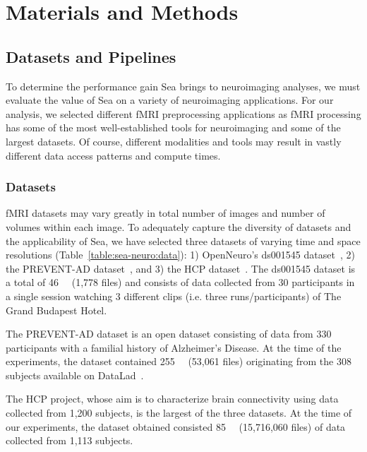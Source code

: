 \documentclass[fleqn,10pt]{wlscirep}
\begin{document}
    
    
    \section{Materials and Methods}
    
    
    \subsection{Datasets and Pipelines}
    
    To determine the performance gain Sea brings to neuroimaging analyses, we
    must evaluate the value of Sea on a variety of neuroimaging applications.
    For our analysis, we selected different fMRI preprocessing applications as
    fMRI processing has some of the most well-established tools for neuroimaging
    and some of the largest datasets. Of course, different modalities and tools
    may result in vastly different data access patterns and compute times.
    
    \subsubsection{Datasets}
    fMRI datasets may vary greatly in total number of images and number of
    volumes within each image. To adequately capture the diversity of datasets
    and the applicability of Sea, we have selected three datasets of varying
    time and space resolutions (Table~\ref{table:sea-neuro:data}): 1)
    OpenNeuro's ds001545 dataset~\cite{ds001545}, 2) the PREVENT-AD
    dataset~\cite{preventad}, and 3) the HCP dataset~\cite{HCP}. The ds001545
    dataset is a total of \SI{46}{\giga\byte} (1,778 files) and consists of data
    collected from 30 participants in a single session watching 3 different
    clips (i.e. three runs/participants) of The Grand Budapest Hotel.
    
    
    The PREVENT-AD dataset is an open dataset consisting of data from 330
    participants with a familial history of Alzheimer's Disease. At the time of
    the experiments, the dataset contained \SI{255}{\giga\byte} (53,061 files)
    originating from the 308 subjects available on
    DataLad~\cite{halchenko2021datalad}.
    
    The HCP project, whose aim is to characterize brain connectivity using data
    collected from 1,200 subjects, is the largest of the three datasets. At the
    time of our experiments, the dataset obtained consisted \SI{85}{\tera\byte}
    (15,716,060 files) of data collected from 1,113 subjects.
    
\end{document}
